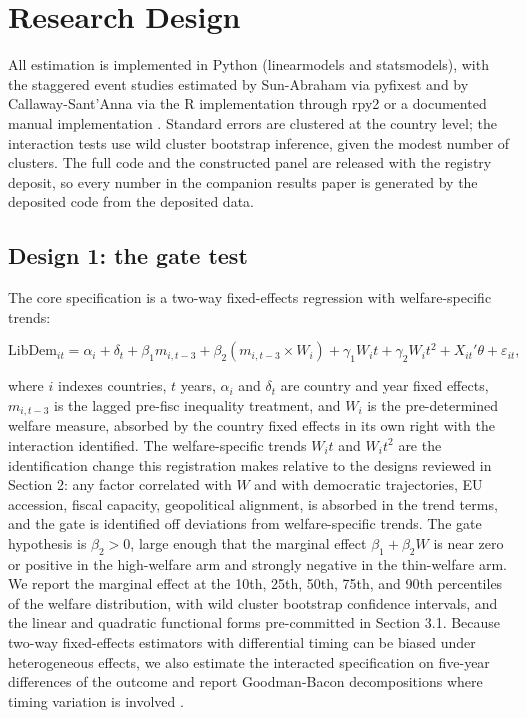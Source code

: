 \documentclass[11pt,letterpaper]{article}
\begin{document}
\section{Research Design}

All estimation is implemented in Python (linearmodels and statsmodels), with the staggered event studies estimated by Sun-Abraham via pyfixest and by Callaway-Sant'Anna via the R implementation through rpy2 or a documented manual implementation \citep{Callaway2021, SunAbraham2021}. Standard errors are clustered at the country level; the interaction tests use wild cluster bootstrap inference, given the modest number of clusters. The full code and the constructed panel are released with the registry deposit, so every number in the companion results paper is generated by the deposited code from the deposited data.

\subsection{Design 1: the gate test}

The core specification is a two-way fixed-effects regression with welfare-specific trends:

\[
\text{LibDem}_{it} = \alpha_i + \delta_t + \beta_1 m_{i,t-3} + \beta_2 \left(m_{i,t-3} \times W_i\right) + \gamma_1 W_i t + \gamma_2 W_i t^2 + X_{it}'\theta + \varepsilon_{it},
\]

where $i$ indexes countries, $t$ years, $\alpha_i$ and $\delta_t$ are country and year fixed effects, $m_{i,t-3}$ is the lagged pre-fisc inequality treatment, and $W_i$ is the pre-determined welfare measure, absorbed by the country fixed effects in its own right with the interaction identified. The welfare-specific trends $W_i t$ and $W_i t^2$ are the identification change this registration makes relative to the designs reviewed in Section 2: any factor correlated with $W$ and with democratic trajectories, EU accession, fiscal capacity, geopolitical alignment, is absorbed in the trend terms, and the gate is identified off deviations from welfare-specific trends. The gate hypothesis is $\beta_2 > 0$, large enough that the marginal effect $\beta_1 + \beta_2 W$ is near zero or positive in the high-welfare arm and strongly negative in the thin-welfare arm. We report the marginal effect at the 10th, 25th, 50th, 75th, and 90th percentiles of the welfare distribution, with wild cluster bootstrap confidence intervals, and the linear and quadratic functional forms pre-committed in Section 3.1. Because two-way fixed-effects estimators with differential timing can be biased under heterogeneous effects, we also estimate the interacted specification on five-year differences of the outcome and report Goodman-Bacon decompositions where timing variation is involved \citep{GoodmanBacon2021}.
\end{document}
